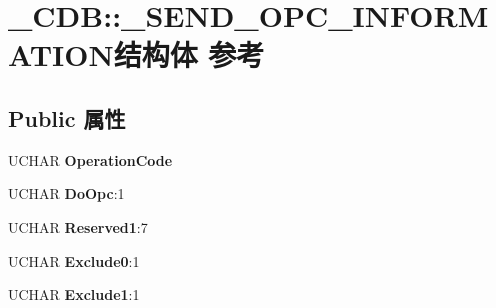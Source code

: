 \hypertarget{struct___c_d_b_1_1___s_e_n_d___o_p_c___i_n_f_o_r_m_a_t_i_o_n}{}\section{\+\_\+\+C\+DB\+:\+:\+\_\+\+S\+E\+N\+D\+\_\+\+O\+P\+C\+\_\+\+I\+N\+F\+O\+R\+M\+A\+T\+I\+O\+N结构体 参考}
\label{struct___c_d_b_1_1___s_e_n_d___o_p_c___i_n_f_o_r_m_a_t_i_o_n}
\subsection*{Public 属性}
\begin{DoxyCompactItemize}
\item 
\mbox{\label{struct___c_d_b_1_1___s_e_n_d___o_p_c___i_n_f_o_r_m_a_t_i_o_n_adf3c1c98d288e16ae107e9e3b4910d33}} 
U\+C\+H\+AR {\bfseries Operation\+Code}
\item 
\mbox{\label{struct___c_d_b_1_1___s_e_n_d___o_p_c___i_n_f_o_r_m_a_t_i_o_n_a6ad446a26a5816c1c012fc7f5305c034}} 
U\+C\+H\+AR {\bfseries Do\+Opc}\+:1
\item 
\mbox{\label{struct___c_d_b_1_1___s_e_n_d___o_p_c___i_n_f_o_r_m_a_t_i_o_n_ae0e5373aec494fa9a68d75da4137879f}} 
U\+C\+H\+AR {\bfseries Reserved1}\+:7
\item 
\mbox{\label{struct___c_d_b_1_1___s_e_n_d___o_p_c___i_n_f_o_r_m_a_t_i_o_n_a18fa289475283de2af3a73abb34422fc}} 
U\+C\+H\+AR {\bfseries Exclude0}\+:1
\item 
\mbox{\label{struct___c_d_b_1_1___s_e_n_d___o_p_c___i_n_f_o_r_m_a_t_i_o_n_a2d145c943f1fe6dfa180b0c8c65e509a}} 
U\+C\+H\+AR {\bfseries Exclude1}\+:1
\item 
\mbox{\label{struct___c_d_b_1_1___s_e_n_d___o_p_c___i_n_f_o_r_m_a_t_i_o_n_afea584b46cd5f7aa5ef3db2518597b02}} 

\end{DoxyCompactItemize}
